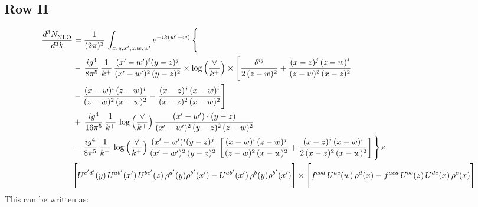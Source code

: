 \documentclass[9pt]{article}
\numberwithin{equation}{section}
\begin{document}
\subsection{Row II}
\begin{align}
     \frac{d^{3}N_{\rm NLO}^{\rm}}{d^{3}k}  & =   \frac{1}{(2\pi)^{3}}\, \int_{x,y,x',z,w,w^{\prime}} e^{-ik(w^{\prime}-w)}\, \Bigg\{\notag \\
& -\,\frac{ig^{4}}{8\pi^{5}}\,\frac{1}{k^{+}}\,\frac{(x'-w')^{i}(y-z)^{j}}{(x'-w')^{2}\,(y-z)^{2}}\times \log{\left(\frac{\vee}{k^{+}}\right)}\times \Bigg[\frac{\delta^{ij}}{2\,(z-w)^{2}}+\frac{(x-z)^{j}\,(z-w)^{i}}{(z-w)^{2}\,(x-z)^{2}}\notag \\ & -\frac{(x-w)^{i}\,(z-w)^{j}}{(z-w)^{2}\,(x-w)^{2}}-\frac{(x-z)^{j}\,(x-w)^{i}}{(x-z)^{2}\,(x-w)^{2}}\Bigg] \notag \\
& +\,\frac{ig^{4}}{16\pi^{5}}\,\frac{1}{k^{+}}\,\log{\left(\frac{\vee}{k^{+}}\right)}\, \frac{(x'-w')\cdot (y-z)}{(x'-w')^{2}\,(y-z)^{2}\,(z-w)^{2}} \notag \\
& -\frac{ig^{4}}{8\pi^{5}}\,\frac{1}{k^{+}}\,\log{\left(\frac{\vee}{k^{+}}\right)}\,\frac{(x'-w')^{i}(y-z)^{j}}{(x'-w')^{2}\,(y-z)^{2}}\,\left[\frac{(x-w)^{i}\,(z-w)^{j}}{(z-w)^{2}\,(x-w)^{2}}+\frac{(x-z)^{j}\,(x-w)^{i}}{2\,(x-z)^{2}\, (x-w)^{2}}\right]\Bigg\}\times \notag \\ & \Bigg[U^{c'd'}(y)\,U^{ab'}(x')\,U^{bc'}(z)\,\rho^{d'}(y)\rho^{b'}(x')-U^{ab'}(x')\,\rho^{b}(y)\rho^{b'}(x')\Bigg]\times\Bigg[f^{cbd}\,U^{ac}(w)\,\rho^{d}(x)-f^{acd}\, U^{bc}(z)\,U^{de}(x)\,\rho^{e}(x)\Bigg]
\end{align}
This can be written as:
\end{document}
